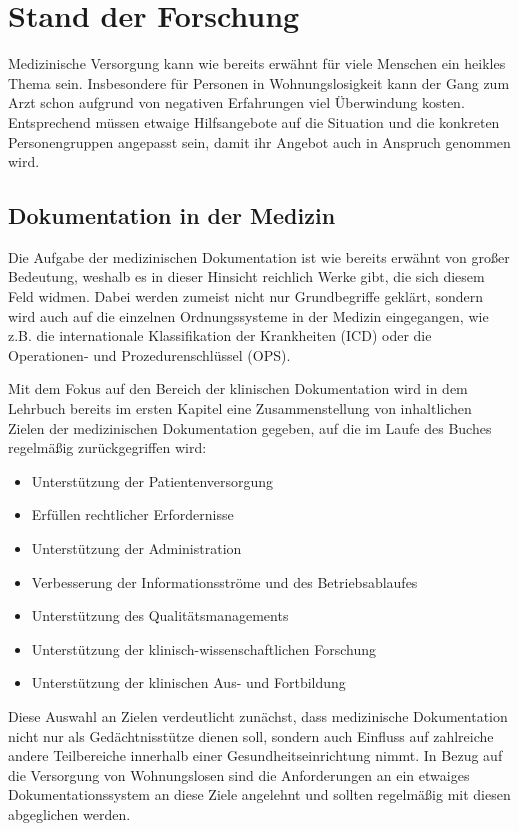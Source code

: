 \chapter{Stand der Forschung}\label{ch:relatedWork}

Medizinische Versorgung kann wie bereits erwähnt für viele Menschen ein heikles Thema sein. Insbesondere für Personen in Wohnungslosigkeit kann der Gang zum Arzt schon aufgrund von negativen Erfahrungen viel Überwindung kosten. Entsprechend müssen etwaige Hilfsangebote auf die Situation und die konkreten Personengruppen angepasst sein, damit ihr Angebot auch in Anspruch genommen wird.

\section{Dokumentation in der Medizin}

Die Aufgabe der medizinischen Dokumentation ist wie bereits erwähnt von großer Bedeutung, weshalb es in dieser Hinsicht reichlich Werke gibt, die sich diesem Feld widmen. Dabei werden zumeist nicht nur Grundbegriffe geklärt, sondern wird auch auf die einzelnen Ordnungssysteme in der Medizin eingegangen, wie z.B. die internationale Klassifikation der Krankheiten (ICD) oder die Operationen- und Prozedurenschlüssel (OPS).

Mit dem Fokus auf den Bereich der klinischen Dokumentation wird in dem Lehrbuch \citet{Leiner.2012} bereits im ersten Kapitel eine Zusammenstellung von inhaltlichen Zielen der medizinischen Dokumentation gegeben, auf die im Laufe des Buches regelmäßig zurückgegriffen wird:

\begin{itemize}
	\item Unterstützung der Patientenversorgung
	\item Erfüllen rechtlicher Erfordernisse
	\item Unterstützung der Administration
	\item Verbesserung der Informationsströme und des Betriebsablaufes
	\item Unterstützung des Qualitätsmanagements
	\item Unterstützung der klinisch-wissenschaftlichen Forschung
	\item Unterstützung der klinischen Aus- und Fortbildung
\end{itemize}

Diese Auswahl an Zielen verdeutlicht zunächst, dass medizinische Dokumentation nicht nur als Gedächtnisstütze dienen soll, sondern auch Einfluss auf zahlreiche andere Teilbereiche innerhalb einer Gesundheitseinrichtung nimmt. In Bezug auf die Versorgung von Wohnungslosen sind die Anforderungen an ein etwaiges Dokumentationssystem an diese Ziele angelehnt und sollten regelmäßig mit diesen abgeglichen werden.

